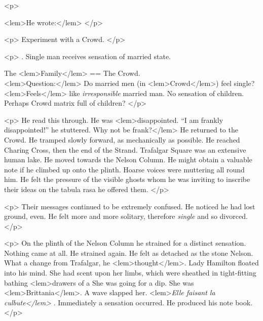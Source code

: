{{				<p>
				
<lem>He wrote:</lem>{}
				</p>

				<p>
				\vspace{10pt}
				\noindent\large{Experiment with a Crowd.}
				</p>

				<p>
				.\hspace{5pt} Single man receives sensation of married state.

				The 
<lem>Family</lem>
					{} 
				=\hspace{-0.5mm}= The Crowd.\\ 
				
<lem>Question:</lem> 
					{}
				Do married men (in 
<lem>Crowd</lem>{}) feel single? \\
				
<lem>Feels</lem>{} like \emph{irresponsible} married man. No sensation of children.\\ 
				Perhaps Crowd matrix full of children?
				</p> 

				<p>
				\vspace{10pt}
				He read this through. He was 
<lem>disappointed. “I am frankly disappointed!” he stuttered. Why not be frank?</lem>
					{}  
				He returned to the Crowd. He tramped 
				slowly forward, as mechanically as possible. He reached Charing Cross, then the end 
				of the Strand. Trafalgar Square was an extensive human lake. He moved towards the 
				Nelson Column. He might obtain a valuable note if he climbed up onto the plinth. 
				Hoarse voices were muttering all round him. He felt the pressure of the visible 
				ghosts whom he was inviting to inscribe their ideas on the tabula rasa he offered them. 
				</p> 

				<p>
				Their messages continued to be extremely confused. He noticed he had lost ground, even. 
				He felt more and more solitary, therefore \emph{single} and so divorced. 
				</p> 

				<p>
				On the plinth of the Nelson Column he strained for a distinct sensation. Nothing came 
				at all. He strained again. He felt as detached as the stone Nelson. What a change 
				from Trafalgar, he 
<lem>thought</lem>{}. Lady Hamilton floated into his mind. She had scent upon 
				her limbs, which were sheathed in tight-fitting bathing 
<lem>drawers of a 
					{} 
				She was going for a 
				dip. She was 
<lem>Brittania</lem>{}. A wave slapped her. 
<lem>\emph{Elle faisant la culbute</lem>}
					{}. 
				Immediately a 
				sensation occurred. He produced his note book. 
				</p> 

}}
